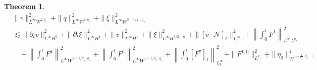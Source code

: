 \documentclass[letterpaper,reqno,10pt,twoside]{amsart}
\newtheorem{theorem}{Theorem}[section]
\theoremstyle{definition}
\theoremstyle{remark}
\def\p{\partial}
\begin{document}
\begin{theorem}{\label{thm:pressure_+}}
		\begin{equation}\label{est:diss_10}
			\begin{aligned}
				&\| v\|_{L^\infty W^{2,q_+}}^2 + \|q\|_{L^\infty W^{1,q_+}}^2 + \|\xi\|_{L^\infty W^{3-1/q_+,q_+}}^2 \\
				&\lesssim  \|\p_tv\|_{L^\infty H^0}^2 +\|\p_{t}\xi \|_{L^\infty H^1}^2 + \|v\|_{L^\infty H^1}^2 + \|\xi\|_{L^\infty H^{3/2-\alpha}}^2 + \|[v\cdot \mathcal{N}]_\ell\|_{L^\infty_t}^2+ \left\|\int_{0}^{t}F^1 \right\|_{L^\infty 
					L^{q_+}}^2\\
				&\quad  + \left\|\int_{0}^{t}F^4 \right\|_{L^\infty W^{1-1/q_+,q_+}}^2 + \left\|\int_{0}^{t}F^5 \right\|_{L^\infty W^{1-1/q_+,q_+}}^2 + \left\|\int_{0}^{t}[F^7]_\ell \right\|_{L_t^{\infty}}^2 +\|F^{1,0}\|_{L^{q_{+}}}^{2}+\|\eta_{0}\|_{W^{3-\frac{1}{q_{+}},q_{+}}}^{4}.
			\end{aligned}
		\end{equation}
	\end{theorem}
	
\end{document}
